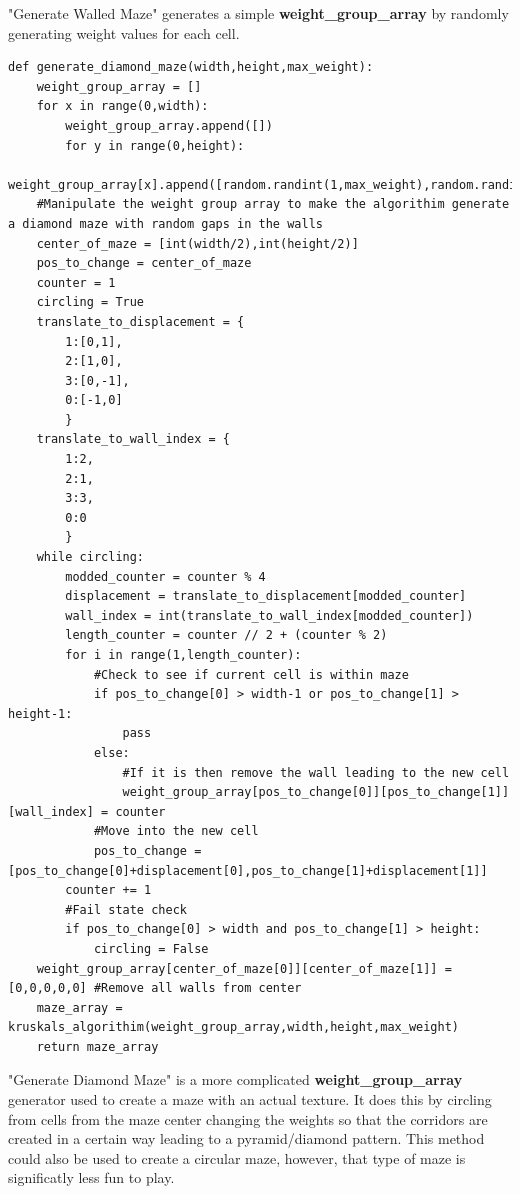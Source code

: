"Generate Walled Maze" generates a simple \textbf{weight\_group\_array} by randomly generating weight values for each cell.
\clearpage
\begin{lstlisting}
def generate_diamond_maze(width,height,max_weight):
    weight_group_array = []
    for x in range(0,width):
        weight_group_array.append([])
        for y in range(0,height):
            weight_group_array[x].append([random.randint(1,max_weight),random.randint(1,max_weight),random.randint(1,max_weight),random.randint(1,max_weight),0])
    #Manipulate the weight group array to make the algorithim generate a diamond maze with random gaps in the walls
    center_of_maze = [int(width/2),int(height/2)]
    pos_to_change = center_of_maze
    counter = 1
    circling = True
    translate_to_displacement = {
        1:[0,1],
        2:[1,0],
        3:[0,-1],
        0:[-1,0]
        }
    translate_to_wall_index = {
        1:2,
        2:1,
        3:3,
        0:0
        }
    while circling:
        modded_counter = counter % 4
        displacement = translate_to_displacement[modded_counter]
        wall_index = int(translate_to_wall_index[modded_counter])
        length_counter = counter // 2 + (counter % 2)
        for i in range(1,length_counter):
            #Check to see if current cell is within maze
            if pos_to_change[0] > width-1 or pos_to_change[1] > height-1:
                pass
            else:
                #If it is then remove the wall leading to the new cell
                weight_group_array[pos_to_change[0]][pos_to_change[1]][wall_index] = counter
            #Move into the new cell
            pos_to_change = [pos_to_change[0]+displacement[0],pos_to_change[1]+displacement[1]]
        counter += 1
        #Fail state check
        if pos_to_change[0] > width and pos_to_change[1] > height:
            circling = False
    weight_group_array[center_of_maze[0]][center_of_maze[1]] = [0,0,0,0,0] #Remove all walls from center
    maze_array = kruskals_algorithim(weight_group_array,width,height,max_weight)
    return maze_array 
\end{lstlisting}
"Generate Diamond Maze" is a more complicated  \textbf{weight\_group\_array} generator used to create a maze with an actual texture. It does this by
circling from cells from the maze center changing the weights so that the corridors are created in a certain way leading to a pyramid/diamond pattern. This method
could also be used to create a circular maze, however, that type of maze is significatly less fun to play. 

